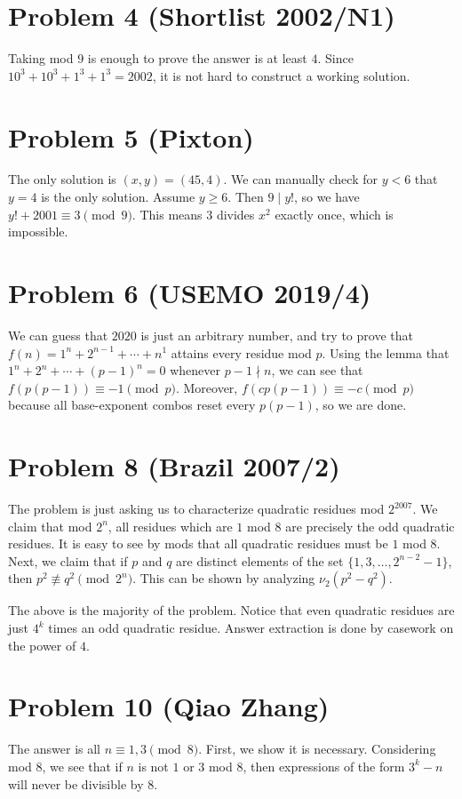 \documentclass{scrartcl}
\begin{document}
\section*{Problem 4 (Shortlist 2002/N1)}
Taking mod $9$ is enough to prove the answer is at least $4$. Since $10^3 + 10^3 + 1^3 + 1^3 = 2002$, it is not hard to construct a working solution.

\section*{Problem 5 (Pixton)}
The only solution is $(x,y) = (45,4)$. We can manually check for $y<6$ that $y=4$ is the only solution. Assume $y \geq 6$. Then $9 \mid y!$, so we have $y! + 2001 \equiv 3 \pmod{9}$. This means $3$ divides $x^2$ exactly once, which is impossible.

\section*{Problem 6 (USEMO 2019/4)}
We can guess that $2020$ is just an arbitrary number, and try to prove that $f(n) = 1^n + 2^{n-1} + \cdots + n^1$ attains every residue mod $p$. Using the lemma that $1^n + 2^n + \cdots + (p-1)^n = 0$ whenever $p-1 \nmid n$, we can see that $f(p(p-1)) \equiv -1 \pmod{p}$. Moreover, $f(cp(p-1)) \equiv -c \pmod{p}$ because all base-exponent combos reset every $p(p-1)$, so we are done.

\section*{Problem 8 (Brazil 2007/2)}
The problem is just asking us to characterize quadratic residues mod $2^{2007}$.
We claim that mod $2^n$, all residues which are $1$ mod $8$ are precisely the odd quadratic residues.
It is easy to see by mods that all quadratic residues must be $1$ mod $8$.
Next, we claim that if $p$ and $q$ are distinct elements of the set $\{1, 3, \ldots, 2^{n-2} - 1\}$, then $p^2 \not\equiv q^2 \pmod{2^n}$.
This can be shown by analyzing $\nu_2(p^2 - q^2)$.

The above is the majority of the problem.
Notice that even quadratic residues are just $4^k$ times an odd quadratic residue.
Answer extraction is done by casework on the power of $4$.

\section*{Problem 10 (Qiao Zhang)}
The answer is all $n \equiv 1,3 \pmod{8}$.
First, we show it is necessary.
Considering mod $8$, we see that if $n$ is not $1$ or $3$ mod $8$, then expressions of the form $3^k - n$ will never be divisible by $8$.
\end{document}
